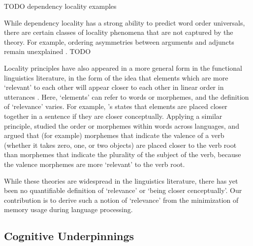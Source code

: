 TODO dependency locality examples 

While dependency locality has a strong ability to predict word order universals, there are certain classes of locality phenomena that are not captured by the theory. For example, ordering asymmetries between arguments and adjuncts remain unexplained \citep{}. TODO 

Locality principles have also appeared in a more general form in the functional linguistics literature, in the form of the idea that elements which are more `relevant' to each other will appear closer to each other in linear order in utterances \citep{behaghel1932deutsche,givon1985iconicity,givon1991markedness,bybee-morphology-1985,newmeyer1992iconicity}. Here, `elements' can refer to words or morphemes, and the definition of `relevance' varies. For example, \citet{givon1985iconicity}'s  states that elements are placed closer together in a sentence if they are closer conceptually.
Applying a similar principle, \citet{bybee-morphology-1985} studied the order or morphemes within words across languages, and argued that (for example) morphemes that indicate the valence of a verb (whether it takes zero, one, or two objects) are placed closer to the verb root than morphemes that indicate the plurality of the subject of the verb, because the valence morphemes are more `relevant' to the verb root. %

While these theories are widespread in the linguistics literature, there has yet been no quantifiable definition of `relevance' or `being closer cenceptually'. Our contribution is to derive such a notion of `relevance' from the minimization of memory usage during language processing.


\subsection{Cognitive Underpinnings}

